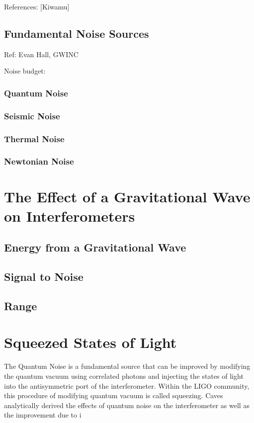 \documentclass[oneside]{book}
\begin{document}
		References: [Kiwamu]
		
		\subsection{Fundamental Noise Sources}
		Ref: Evan Hall, GWINC

		Noise budget:

		\subsubsection{Quantum Noise}
		\subsubsection{Seismic Noise}
		\subsubsection{Thermal Noise}
		\subsubsection{Newtonian Noise}

	
	\section{The Effect of a Gravitational Wave on Interferometers}
	
		\subsection{Energy from a Gravitational Wave}
		
		\subsection{Signal to Noise}
		
		\subsection{Range}
	
	\section{Squeezed States of Light}
	The Quantum Noise is a fundamental source that can be improved by modifying the quantum vacuum using correlated photons and injecting the states of light into the antisymmetric port of the interferometer.  Within the LIGO community, this procedure of modifying quantum vacuum is called squeezing. Caves analytically derived the effects of quantum noise on the interferometer as well as the improvement due to i
	
\end{document}
